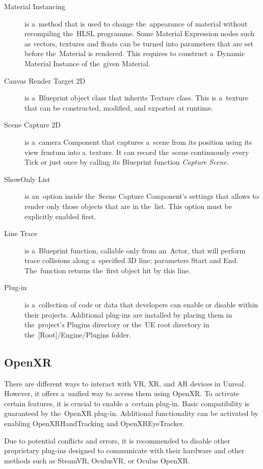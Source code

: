 \begin{description}
    \item[Material Instancing] is a~method that is used to change the~appearance of material without recompiling the~HLSL programme. Some Material Expression nodes such as vectors, textures and floats can be turned into parameters that are set before the~Material is rendered. This requires to construct a~Dynamic Material Instance of the~given Material.
    \item[Canvas Render Target 2D] is a~Blueprint object class that inherits Texture class. This is a~texture that can be constructed, modified, and exported at runtime.
    \item[Scene Capture 2D] is a~camera Component that captures a~scene from its position using its view frustum into a~texture. It can record the~scene continuously every Tick or just once by calling its Blueprint function \emph{Capture Scene}.
    \item[ShowOnly List] is an~option inside the~Scene Capture Component's settings that allows to render only those objects that are in the~list. This option must be explicitly enabled first.
    \item[Line Trace] is a~Blueprint function, callable only from an~Actor, that will perform trace collisions along a~specified 3D line; parameters Start and End. The~function returns the~first object hit by this line.
    \item[Plug-in] is a~collection of code or data that developers can enable or disable within their projects. Additional plug-ins are installed by placing them in the~project's Plugins directory or the~UE root directory in the~[Root]/Engine/Plugins folder.
\end{description}

\subsection{OpenXR}
There are different ways to interact with VR, XR, and AR devices in Unreal. However, it offers a~unified way to access them using OpenXR. To activate certain features, it is crucial to enable a~certain plug-in. Basic compatibility is guaranteed by the~OpenXR plug-in. Additional functionality can be activated by enabling OpenXRHandTracking and OpenXREyeTracker.

Due to potential conflicts and errors, it is recommended to disable other proprietary plug-ins designed to communicate with their hardware and other methods such as SteamVR, OculusVR, or Oculus OpenXR.

